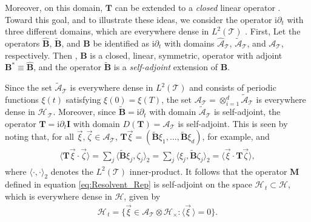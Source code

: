 \documentclass[11pt]{amsart}
\newcommand{\I}{\mathrm{i}}
\newcommand{\Mb}{\mathbf{M}}
\newcommand{\Tb}{\mathbf{T}}
\newcommand{\Ib}{\mathbf{I}}
\newcommand{\Bb}{\mathbf{B}}
\newcommand{\Tc}{\mathcal{T}}
\newcommand{\Hs}{\mathscr{H}}
\newcommand{\As}{\mathscr{A}}
\begin{document}
Moreover, on this domain, $\Tb$ can be
extended to a \emph{closed} linear operator
\cite{Reed-1980,Stone:64}.
Toward this goal, and to illustrate these ideas, we consider the
operator $\I\partial_t$ with three different domains, which are everywhere
dense in $L^2(\Tc)$ \cite{Stone:64}. First,  Let the
operators $\hat{\Bb}$, $\tilde{\Bb}$, and $\Bb$ be identified as
$\I\partial_t$ with domains $\hat{\As}_{\Tc}$, $\tilde{\As}_{\Tc}$, and
$\As_{\Tc}$, respectively. Then \cite{Stone:64}, $\Bb$ is a closed,
linear, symmetric, operator with adjoint $\Bb^*\equiv\hat{\Bb}$, and the
operator $\tilde{\Bb}$ is a \emph{self-adjoint} extension of $\Bb$. 



Since the set $\tilde{\As}_{\Tc}$ is everywhere dense in $L^2(\Tc)$
and consists of periodic functions $\xi(t)$ satisfying $\xi(0)=\xi(T)$,
the set $\As_{\Tc}=\otimes_{i=1}^d\tilde{\As}_{\Tc}$ is everywhere dense in
$\Hs_{\,\Tc}$. Moreover, since $\tilde{\Bb}=\I\partial_t$ with domain
$\tilde{\As}_{\Tc}$ is self-adjoint, the operator $\Tb=\I\partial_t\Ib$ with
domain $D(\Tb)=\As_{\Tc}$ is self-adjoint. This is seen by noting
that, for all $\vec{\xi},\vec{\zeta}\in\As_{\Tc}$,
$\Tb\vec{\xi}=(\tilde{\Bb}\xi_1,\ldots,\tilde{\Bb}\xi_d)$, for example, and  
%
\begin{align}
  \langle\Tb\vec{\xi}\cdot\vec{\zeta}\rangle=\sum_j\langle\tilde{\Bb}\xi_j,\zeta_j\rangle_2
                    =\sum_j\langle\xi_j,\tilde{\Bb}\zeta_j\rangle_2
                    =\langle\vec{\xi}\cdot\Tb\vec{\zeta}\rangle,
\end{align}
%
where $\langle\cdot,\cdot\rangle_2$ denotes the $L^2(\Tc)$ inner-product.
It follows that the operator $\Mb$ defined in equation
\eqref{eq:Resolvent_Rep} is self-adjoint on the space $\Hs_{\,t}\subset\Hs$,
which is everywhere dense in $\Hs$, given by
%
\begin{align}\label{eq:Ht_2}
  \Hs_{\,t}=\{\vec{\xi}\in\As_{\Tc}\otimes\Hs_\times: \langle\vec{\xi}\,\rangle=0\}.
\end{align}
%
\end{document}
